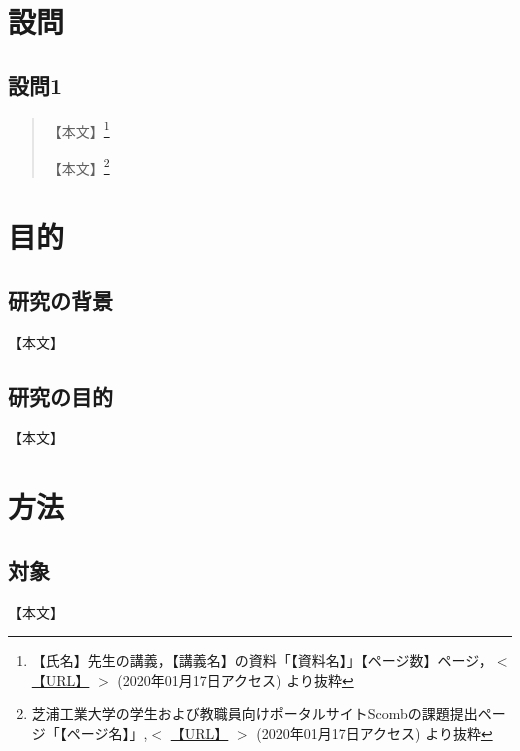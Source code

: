 \documentclass[a4paper, papersize]{jsarticle}
\begin{document}
\begin{multicols}{2}
\section{設問}


\subsection{設問1}
\begin{quotation}
【本文】\footnote{【氏名】先生の講義，【講義名】の資料「【資料名】」【ページ数】ページ，$<$ \url{【URL】} $>$ (2020年01月17日アクセス) より抜粋}

【本文】\footnote{芝浦工業大学の学生および教職員向けポータルサイトScombの課題提出ページ「【ページ名】」,$<$ \url{【URL】} $>$ (2020年01月17日アクセス) より抜粋} 
\end{quotation}


\section{目的}


\subsection{研究の背景}
【本文】


\subsection{研究の目的}
【本文】


\section{方法}


\subsection{対象}
【本文】


\end{multicols}
\end{document}
